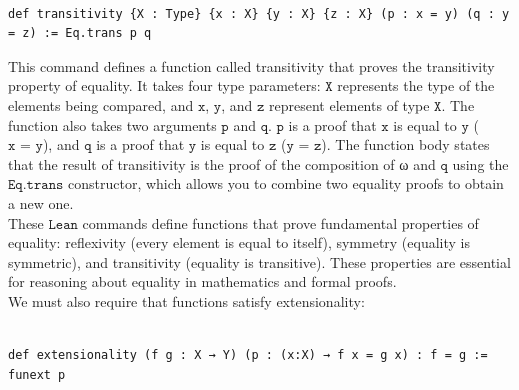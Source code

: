 \documentclass{book}
\theoremstyle{definition}
\newcounter{lcounter}
\begin{document}
\begin{center}
\begin{tcolorbox}[width=5in,colback={white},title={\begin{center}\texttt{Lean \thelcounter} \addtocounter{lcounter}{1}  \end{center}},colbacktitle=Blue,coltitle=black]
\begin{verbatim}

def transitivity {X : Type} {x : X} {y : X} {z : X} (p : x = y) (q : y = z) := Eq.trans p q

\end{verbatim}
\end{tcolorbox}
\end{center}

This command defines a function called transitivity that proves the transitivity property of equality. It takes four type parameters: $\texttt{X}$ represents the type of the elements being compared, and $\texttt{x}$, $\texttt{y}$, and $\texttt{z}$ represent elements of type $\texttt{X}$. The function also takes two arguments $\texttt{p}$ and $\texttt{q}$. $\texttt{p}$ is a proof that $\texttt{x}$ is equal to $\texttt{y}$ ($\texttt{x = y}$), and $\texttt{q}$ is a proof that $\texttt{y}$ is equal to $\texttt{z}$ ($\texttt{y = z}$). The function body states that the result of transitivity is the proof of the composition of ω and $\texttt{q}$ using the $\texttt{Eq.trans}$ constructor, which allows you to combine two equality proofs to obtain a new one.\\

These $\texttt{Lean}$ commands define functions that prove fundamental properties of equality: reflexivity (every element is equal to itself), symmetry (equality is symmetric), and transitivity (equality is transitive). These properties are essential for reasoning about equality in mathematics and formal proofs.\\

We must also require that functions satisfy extensionality:

\begin{center}
\begin{tcolorbox}[width=5in,colback={white},title={\begin{center}\texttt{Lean \thelcounter} \addtocounter{lcounter}{1}  \end{center}},colbacktitle=Blue,coltitle=black]
\begin{verbatim}

def extensionality (f g : X → Y) (p : (x:X) → f x = g x) : f = g := funext p

\end{verbatim}
\end{tcolorbox}
\end{center}
\end{document}
